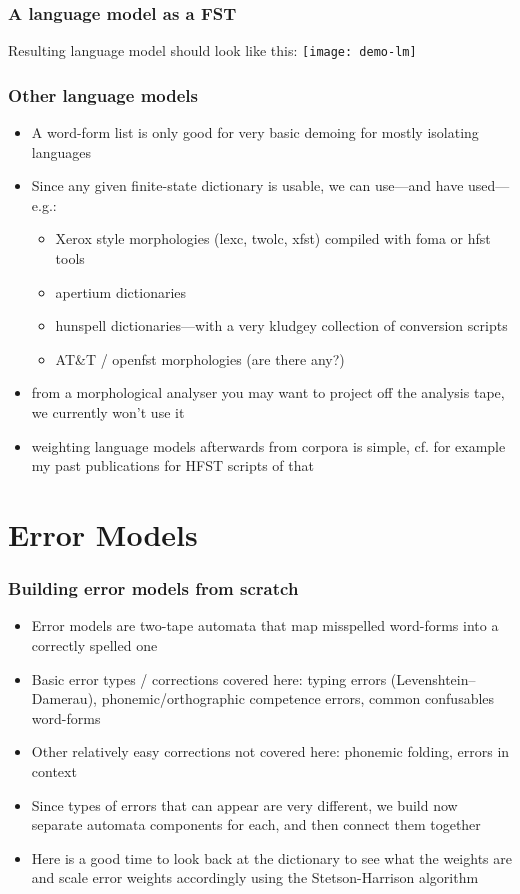 \documentclass[t,12pt,pdftex]{beamer}
\begin{document}
\begin{frame}
    \frametitle{A language model as a FST}
    Resulting language model should look like this:
\texttt{[image: demo-lm]}
\end{frame}

\begin{frame}
    \frametitle{Other language models}
    \begin{itemize}
        \item A word-form list is only good for very basic demoing for mostly
            isolating languages
        \item Since any given finite-state dictionary is usable, we can 
            use---and have used---e.g.:\begin{itemize}
                \item Xerox style morphologies (lexc, twolc, xfst)
                    compiled with foma or hfst tools
                \item apertium dictionaries
                \item hunspell dictionaries---with a very kludgey collection
                    of conversion scripts
                \item AT\&T / openfst morphologies (are there any?)
            \end{itemize}
        \item from a morphological analyser you may want to project off the
            analysis tape, we currently won't use it
        \item weighting language models afterwards from corpora is simple, cf.
            for example my past publications for HFST scripts of that
    \end{itemize}
\end{frame}

\section{Error Models}

\begin{frame}
   \frametitle{Building error models from scratch}
   \begin{itemize}
       \item Error models are two-tape automata that map misspelled word-forms
           into a correctly spelled one
       \item Basic error types / corrections covered here: typing errors 
           (Levenshtein--Damerau), phonemic/orthographic competence errors,
           common confusables word-forms
       \item Other relatively easy corrections not covered here: phonemic
           folding, errors in context
       \item Since types of errors that can appear are very different, we
           build now separate automata components for each, and then
           connect them together
       \item Here is a good time to look back at the dictionary to see what
           the weights are and scale error weights accordingly using
           the Stetson-Harrison algorithm
   \end{itemize}
\end{frame}
\end{document}
